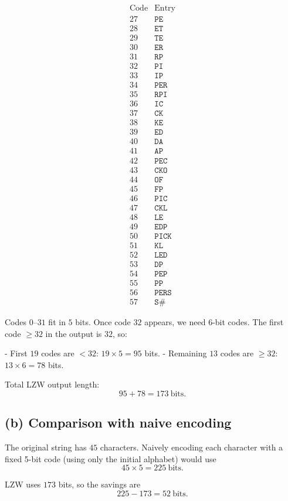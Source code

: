 \[
\begin{array}{c|l}
\text{Code} & \text{Entry} \\ \hline
27 & \texttt{PE}\\
28 & \texttt{ET}\\
29 & \texttt{TE}\\
30 & \texttt{ER}\\
31 & \texttt{RP}\\
32 & \texttt{PI}\\
33 & \texttt{IP}\\
34 & \texttt{PER}\\
35 & \texttt{RPI}\\
36 & \texttt{IC}\\
37 & \texttt{CK}\\
38 & \texttt{KE}\\
39 & \texttt{ED}\\
40 & \texttt{DA}\\
41 & \texttt{AP}\\
42 & \texttt{PEC}\\
43 & \texttt{CKO}\\
44 & \texttt{OF}\\
45 & \texttt{FP}\\
46 & \texttt{PIC}\\
47 & \texttt{CKL}\\
48 & \texttt{LE}\\
49 & \texttt{EDP}\\
50 & \texttt{PICK}\\
51 & \texttt{KL}\\
52 & \texttt{LED}\\
53 & \texttt{DP}\\
54 & \texttt{PEP}\\
55 & \texttt{PP}\\
56 & \texttt{PERS}\\
57 & \texttt{S\#}
\end{array}
\]

Codes \(0\)–\(31\) fit in \(5\) bits. Once code \(32\) appears, we need \(6\)-bit codes.
The first code \(\ge 32\) in the output is \(32\), so:

- First \(19\) codes are \(<32\): \(19\times 5 = 95\) bits.
- Remaining \(13\) codes are \(\ge 32\): \(13\times 6 = 78\) bits.

Total LZW output length:
\[
\boxed{95+78=173\ \text{bits}}.
\]

\subsection*{(b) Comparison with naive encoding}

The original string has \(45\) characters.
Naively encoding each character with a fixed 5-bit code (using only the
initial alphabet) would use
\[
45\times 5 = 225\ \text{bits}.
\]

LZW uses \(173\) bits, so the savings are
\[
225-173 = \boxed{52\ \text{bits}}.
\]
